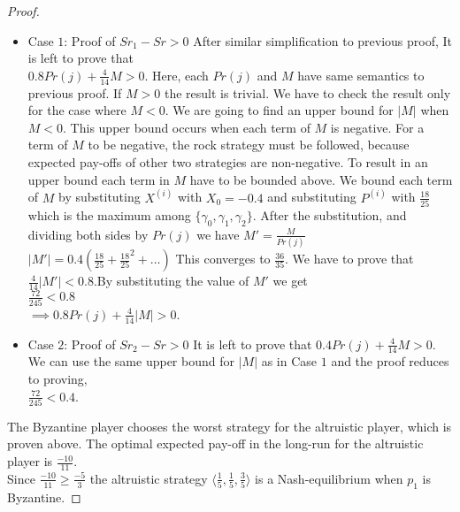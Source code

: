 \begin{proof}
 \begin{itemize}
 	\item Case $1$: Proof of $Sr_1 - Sr > 0$
 	After similar simplification to previous proof, It is left to prove that\\
 	$0.8Pr(j) + \frac{4}{14}M > 0$. Here, each $Pr(j)$ and $M$ have same semantics to previous proof. If $M>0$ the result is trivial. We have to check the result only for the case where $M < 0$. We are going to find an upper bound for $|M|$ when $M<0$. This upper bound occurs when each term of $M$ is negative. For a term of $M$ to be negative, the rock strategy must be followed, because expected pay-offs of other two strategies are non-negative. To result in an upper bound each term in $M$ have to be bounded above. We bound each term of $M$ by substituting $X^{(i)}$ with $X_0=-0.4$ and substituting $P^{(i)}$ with $\frac{18}{25}$ which is the maximum among $\{ \gamma_0, \gamma_1, \gamma_2 \}$. After the substitution, and dividing both sides by $Pr(j)$ we have $M'= \frac{M}{Pr(j)}$\\
 	$|M'| = 0.4(\frac{18}{25}+\frac{18}{25}^2+ \dots)$ This converges to $\frac{36}{35}$. We have to prove that\\
 	$\frac{4}{14}|M'| < 0.8$.By substituting the value of $M'$ we get\\
 	$\frac{72}{245} < 0.8$ \\
 	$\implies 0.8Pr(j) + \frac{4}{14}|M| > 0 $.
 	
 	\item Case $2$: Proof of $Sr_2 - Sr > 0$
 	It is left to prove that $0.4Pr(j) + \frac{4}{14}M > 0$. We can use the same upper bound for $|M|$ as in Case $1$ and the proof reduces to proving,\\
 	$\frac{72}{245} < 0.4$.
 \end{itemize}
 
 The Byzantine player chooses the worst strategy for the altruistic player, which is proven above. The optimal expected pay-off in the long-run for the altruistic player is $\frac{-10}{11}$. \\
 Since $\frac{-10}{11} \ge \frac{-5}{3}$ the altruistic strategy $\langle \frac{1}{5},\frac{1}{5},\frac{3}{5} \rangle$ is a Nash-equilibrium when $p_1$ is Byzantine. 	
\end{proof}

 

 	


